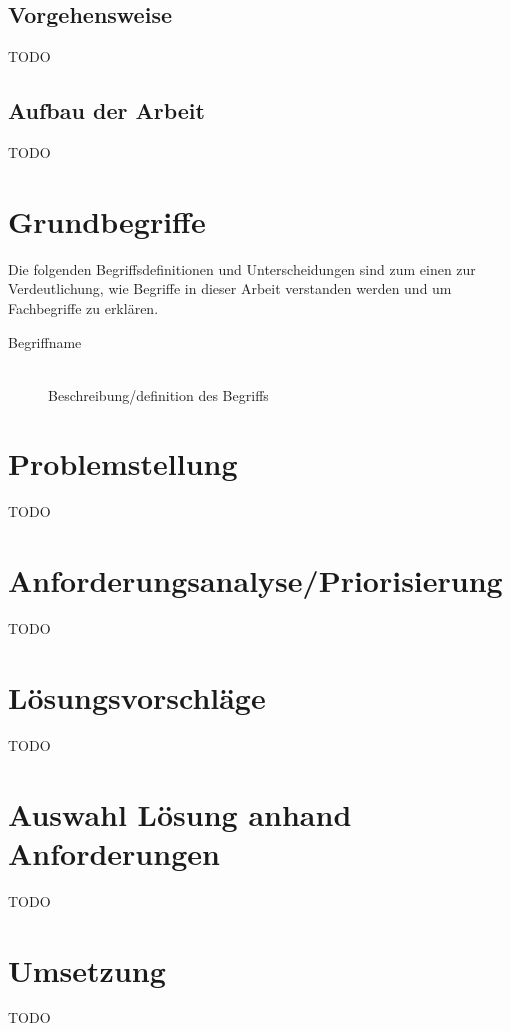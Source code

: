 \documentclass[a4paper,11pt,singlespacing]{article}
\begin{document}
	\subsection{Vorgehensweise}\label{sec:Vorgehensweise}
		TODO

	\subsection{Aufbau der Arbeit}\label{sec:Aufbau}
		TODO


\section{Grundbegriffe}\label{sec:Grundbegriffe}
	Die folgenden Begriffsdefinitionen und Unterscheidungen sind zum einen zur Verdeutlichung, wie Begriffe in dieser Arbeit verstanden werden und um Fachbegriffe zu erklären.
	
	\begin{description}
	\item[Begriffname\label{itm:BegriffReferenzname}]\hfill \\
		Beschreibung/definition des Begriffs \cite{BeispielBuch}
	\end{description}


\section{Problemstellung}\label{sec:Problemstellung}
	TODO


\section{Anforderungsanalyse/Priorisierung}\label{sec:AnforderungsanalysePriorisierung}
	TODO


\section{Lösungsvorschläge}\label{sec:Lösungsvorschläge}
	TODO


\section{Auswahl Lösung anhand Anforderungen}\label{sec:AuswahlLösungAnhandAnforderungen}
	TODO


\section{Umsetzung}\label{sec:Umsetzung}
	TODO
\end{document}
